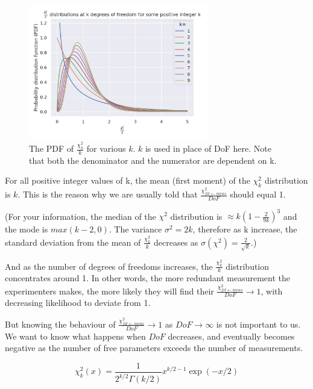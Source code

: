 \documentclass[a4paper, 12pt]{article}
\newcommand{\chifit}{\frac{\chi^2_{fit\leftarrow meas}}{DoF} }
\begin{document}
\begin{figure}[H]
\centering
\includegraphics[width=0.7\textwidth]{Normalized_chi2_DoF.png}
\caption{The PDF of $\frac{\chi^2_k}{k}$ for various $k$. $k$ is used in place of DoF here. Note that both the denominator and the numerator are dependent on k.}\label{Normalized_chi2_DoF}
\end{figure}

For all positive integer values of k, the mean (first moment) of the $\chi^2_k$ distribution is $k$. This is the reason why we are usually told that $\chifit$ should equal 1. 

(For your information, the median of the $\chi^2$ distribution is $\approx k(1-\frac{2}{9k})^3$ and the mode is $max(k-2, 0)$. The variance $\sigma^2=2k$, therefore as k increase, the standard deviation from the mean of $\frac{\chi^2_k}{k}$ decreases as $\sigma(\chi^2)= \frac{2}{\sqrt{k}}$.)

And as the number of degrees of freedoms increases, the $\frac{\chi^2_k}{k}$ distribution concentrates around 1. In other words, the more redundant measurement the experimenters makes, the more likely they will find their $\chifit\rightarrow1$, with decreasing likelihood to deviate from 1.

But knowing the behaviour of $\chifit\rightarrow1$ as $DoF\rightarrow\infty$ is not important to us. We want to know what happens when $DoF$ decreases, and eventually becomes negative as the number of free parameters exceeds the number of measurements.

\begin{equation}\label{chi2 definition}
    \chi^2_k (x)=\frac{1}{2^{k/2} \Gamma \left( k/2 \right)}
                  x^{k/2-1} \exp \left( -x/2 \right)
\end{equation}
\end{document}
